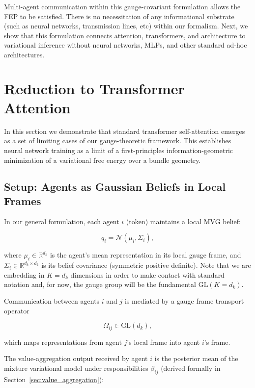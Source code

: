\documentclass[twoside,11pt]{article}
\begin{document}
Multi-agent communication within this gauge-covariant formulation allows the FEP to be satisfied. There is no necessitation of any informational substrate (such as neural networks, transmission lines, etc) within our formalism. Next, we show that this formulation connects attention, transformers, and architecture to variational inference without neural networks, MLPs, and other standard ad-hoc architectures.

\section{Reduction to Transformer Attention}

In this section we demonstrate that standard transformer self-attention emerges as a set of limiting cases of our gauge-theoretic framework. This establishes neural network training as a limit of a first-principles information-geometric minimization of a variational free energy over a bundle geometry.

\subsection{Setup: Agents as Gaussian Beliefs in Local Frames}

In our general formulation, each agent $i$ (token) maintains a local MVG belief:

\begin{equation}
q_i = \mathcal{N}(\mu_i, \Sigma_i),
\end{equation}

where $\mu_i \in \mathbb{R}^{d_k}$ is the agent's mean representation in its local gauge frame, and $\Sigma_i \in \mathbb{R}^{d_k\times d_k}$ is its belief covariance (symmetric positive definite). Note that we are embedding in $K=d_k$ dimensions in order to make contact with standard notation and, for now, the gauge group will be the fundamental $\mathrm{GL}(K=d_k)$.

Communication between agents $i$ and $j$ is mediated by a gauge frame transport operator

\begin{equation}
\Omega_{ij} \in \mathrm{GL}(d_k),
\end{equation}

which maps representations from agent $j$'s local frame into agent $i$'s frame. 

The value-aggregation output received by agent $i$ is the posterior mean of the mixture variational model under responsibilities $\beta_{ij}$ (derived formally in Section~\ref{sec:value_aggregation}):
\end{document}
